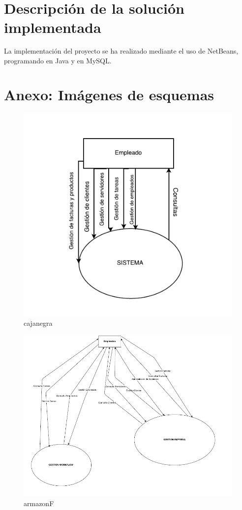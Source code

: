 \documentclass[paper=a4, fontsize=11pt, spanish]{scrartcl}
\begin{document}
\section{Descripción de la solución implementada}
La implementación del proyecto se ha realizado mediante el uso de NetBeans, programando en Java y en MySQL.

\section{Anexo: Imágenes de esquemas}
\newpage
\begin{figure}
	\includegraphics{ERP_EMEGEX.png}
	\caption{cajanegra}
	\label{fig:cajanegra}
\end{figure}

\begin{figure}
	\includegraphics[width=1.25\textwidth]{ArmazonF.png}
	\caption{armazonF}
	\label{fig:armazonF}
\end{figure}
\end{document}
